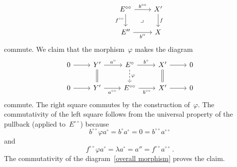\begin{remark}
\begin{enumerate}
\[\begin{tikzcd}
          & E^{\circ\circ}
            \arrow{r}[above]{b^{\circ\circ}}
            \arrow[phantom]{dr}[description]{\pb}
            \arrow{d}[left]{f^{\circ\circ}}
          & X'
            \arrow{d}[right]{f}
          \\
            {}
          & E''
            \arrow{r}[below]{b''}
          & X
        \end{tikzcd}
      \]
      commute.
      We claim that the morphism~$\varphi$ makes the diagram
      \begin{equation}
        \label{overall morphism}
        \begin{tikzcd}
            0
            \arrow{r}
          & Y'
            \arrow{r}[above]{a^\circ}
            \arrow[equal]{d}
          & E^\circ
            \arrow{r}[above]{b^\circ}
            \arrow[dashed]{d}[right]{\varphi}
          & X'
            \arrow{r}
            \arrow[equal]{d}
          & 0
          \\
            0
            \arrow{r}
          & Y'
            \arrow{r}[below]{a^{\circ\circ}}
          & E^{\circ\circ}
            \arrow{r}[below]{b^{\circ\circ}}
          & X'
            \arrow{r}
          & 0
        \end{tikzcd}
      \end{equation}
      commute.
      The right square commutes by the construction of~$\varphi$.
      The commutativity of the left square follows from the universal property of the pullback (applied to~$E^{\circ\circ}$) because
      \[
        b^{\circ\circ} \varphi a^\circ
        =
        b^\circ a^\circ
        =
        0
        =
        b^{\circ\circ} a^{\circ\circ}
      \]
      and
      \[
        f^{\circ\circ} \varphi a^\circ
        =
        \lambda a^\circ
        =
        a''
        =
        f^{\circ\circ} a^{\circ\circ} \,.
      \]
      The commutativity of the diagram~\eqref{overall morphism} proves the claim.
  \end{enumerate}
\end{remark}











